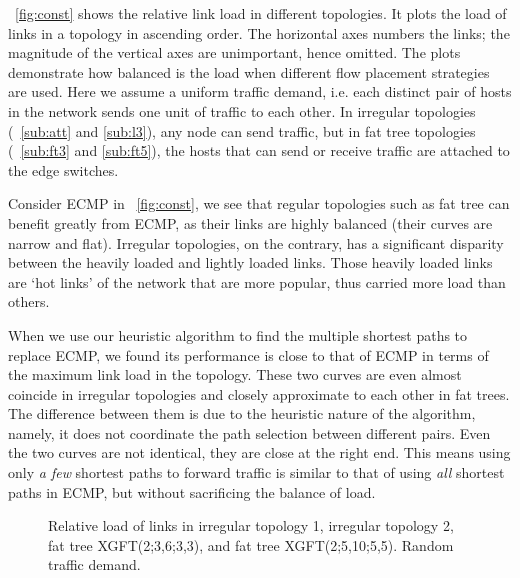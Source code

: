 \documentclass[conference]{IEEEtran}
\begin{document}
\figurename~\ref{fig:const} shows the relative link load in different
topologies. It plots the load of links in a topology in ascending order. The
horizontal axes numbers the links; the magnitude of the vertical axes are
unimportant, hence omitted. The plots demonstrate how balanced is the load
when different flow placement strategies are used. Here we assume a uniform
traffic demand, i.e. each distinct pair of hosts in the network sends one unit
of traffic to each other. In irregular topologies (\figurename~\ref{sub:att}
and \ref{sub:l3}), any node can send traffic, but in fat tree topologies
(\figurename~\ref{sub:ft3} and \ref{sub:ft5}), the hosts that can send or
receive traffic are attached to the edge switches.

Consider ECMP in \figurename~\ref{fig:const}, we see that regular topologies
such as fat tree can benefit greatly from ECMP, as their links are highly
balanced (their curves are narrow and flat). Irregular topologies, on the
contrary, has a significant disparity between the heavily loaded and lightly
loaded links. Those heavily loaded links are `hot links' of the network that
are more popular, thus carried more load than others.

When we use our heuristic algorithm to find the multiple shortest paths to
replace ECMP, we found its performance is close to that of ECMP in terms of the
maximum link load in the topology. These two curves are even almost coincide in
irregular topologies and closely approximate to each other in fat trees. The
difference between them is due to the heuristic nature of the algorithm,
namely, it does not coordinate the path selection between different pairs. Even
the two curves are not identical, they are close at the right end. This means
using only \emph{a few} shortest paths to forward traffic is similar to that of
using \emph{all} shortest paths in ECMP, but without sacrificing the balance of
load.

\begin{figure*}
\caption{Relative load of links in  irregular topology 1,
 irregular topology 2,  fat tree
XGFT(2;3,6;3,3), and  fat tree XGFT(2;5,10;5,5). Random traffic demand.}\label{fig:rand}
\end{figure*}
\end{document}
